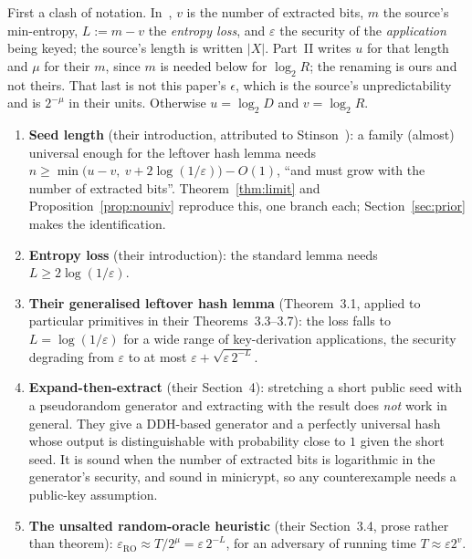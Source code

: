 \documentclass{aicr-solution}
\begin{document}
First a clash of notation. In~\cite{BDKPPSY11}, $v$ is the number of extracted bits, $m$ the
source's min-entropy, $L := m - v$ the \emph{entropy loss}, and $\varepsilon$ the security of the
\emph{application} being keyed; the source's length is written $|X|$. Part~II writes $u$ for
that length and $\mu$ for their $m$, since $m$ is needed below for $\log_2 R$; the renaming is
ours and not theirs. That last is not this paper's
$\epsilon$, which is the source's unpredictability and is $2^{-\mu}$ in their units. Otherwise
$u = \log_2 D$ and $v = \log_2 R$.

\begin{enumerate}
\item \textbf{Seed length} (their introduction, attributed to Stinson~\cite{Sti94}): a family
(almost) universal enough for the leftover hash lemma needs
$n \ge \min\bigl(u-v,\ v + 2\log(1/\varepsilon)\bigr) - O(1)$, ``and must grow with the number of
extracted bits''. Theorem~\ref{thm:limit} and Proposition~\ref{prop:nouniv} reproduce this, one
branch each; Section~\ref{sec:prior} makes the identification.

\item \textbf{Entropy loss} (their introduction): the standard lemma needs
$L \ge 2\log(1/\varepsilon)$.

\item \textbf{Their generalised leftover hash lemma} (Theorem~3.1, applied to particular primitives
in their Theorems~3.3--3.7): the loss falls to $L = \log(1/\varepsilon)$ for a wide range of
key-derivation applications, the security degrading from $\varepsilon$ to at most
$\varepsilon + \sqrt{\varepsilon\,2^{-L}}$.

\item \textbf{Expand-then-extract} (their Section~4): stretching a short public seed with a
pseudorandom generator and extracting with the result does \emph{not} work in general. They give a
DDH-based generator and a perfectly universal hash whose output is distinguishable with probability
close to $1$ given the short seed. It is sound when the number of extracted bits is logarithmic in
the generator's security, and sound in minicrypt, so any counterexample needs a public-key
assumption.

\item \textbf{The unsalted random-oracle heuristic} (their Section~3.4, prose rather than theorem):
$\varepsilon_{\mathrm{RO}} \approx T/2^{\mu} = \varepsilon\,2^{-L}$, for an adversary of running
time $T \approx \varepsilon 2^{v}$.
\end{enumerate}
\end{document}
